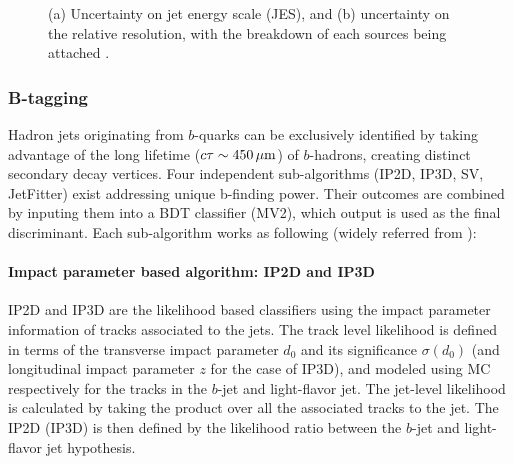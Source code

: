 \begin{figure}[h]
  \centering
    \caption{ (a) Uncertainty on jet energy scale (JES), and (b) uncertainty on the relative resolution, with the breakdown of each sources being attached \cite{144_JESmeas_2015data}.
      \label{fig::objDef::JERUnct2015_pt_144} }
\end{figure}



\subsubsection{B-tagging} \label{sec::objDef::jets::btag}
Hadron jets originating from $b$-quarks can be exclusively identified 
by taking advantage of the long lifetime ($c\tau\sim 450 \, \mathrm{\mu m}$) of $b$-hadrons,
creating distinct secondary decay vertices. 
Four independent sub-algorithms (IP2D, IP3D, SV, JetFitter) exist addressing unique b-finding power. 
Their outcomes are combined by inputing them into a BDT classifier (MV2), which output is used as the final discriminant. Each sub-algorithm works as following (widely referred from \cite{150_bTag_Run2_exp} \cite{151_bTag_Run2_perf} \cite{bTag_Run2_2015data}): 

\paragraph{Impact parameter based algorithm: IP2D and IP3D}
IP2D and IP3D are the likelihood based classifiers using the impact parameter information of tracks associated to the jets. 
The track level likelihood is defined in terms of the transverse impact parameter $d_0$ and its significance $\sigma(d_0)$ (and longitudinal impact parameter $z$ for the case of IP3D), and modeled using MC respectively for the tracks in the $b$-jet and light-flavor jet. The jet-level likelihood is calculated by taking the product over all the associated tracks to the jet.
The IP2D (IP3D) is then defined by the likelihood ratio between the $b$-jet and light-flavor jet hypothesis.


